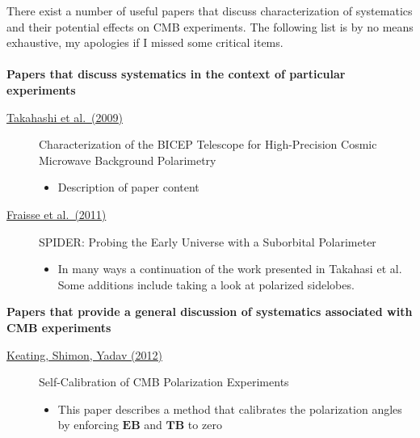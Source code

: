 There exist a number of useful papers that discuss characterization of systematics and their potential effects on CMB experiments. The following list is by no means exhaustive, my apologies if I missed some critical items.
\\ \\
\textbf{Papers that discuss systematics in the context of particular experiments}
\begin{description}

\item[\href{https://arxiv.org/abs/0906.4069}{Takahashi et al.\ (2009)}] Characterization of the BICEP Telescope for High-Precision Cosmic Microwave Background Polarimetry
\begin{itemize}[noitemsep]
\item Description of paper content
\end{itemize}

\item[\href{https://arxiv.org/abs/1106.3087}{Fraisse et al.\ (2011)}] SPIDER: Probing the Early Universe with a Suborbital Polarimeter
\begin{itemize}[noitemsep]
\item In many ways a continuation of the work presented in Takahasi et al. Some additions include taking a look at polarized sidelobes.
\end{itemize}


\end{description}

\noindent \textbf{Papers that provide a general discussion of systematics associated with CMB experiments}
\begin{description}

\item[\href{https://arxiv.org/abs/1211.5734}{Keating, Shimon, Yadav (2012)}] Self-Calibration of CMB Polarization Experiments
\begin{itemize}[noitemsep]
\item This paper describes a method that calibrates the polarization angles by enforcing $\mathbf{EB}$ and $\mathbf{TB}$ to zero
\end{itemize}

\end{description}
